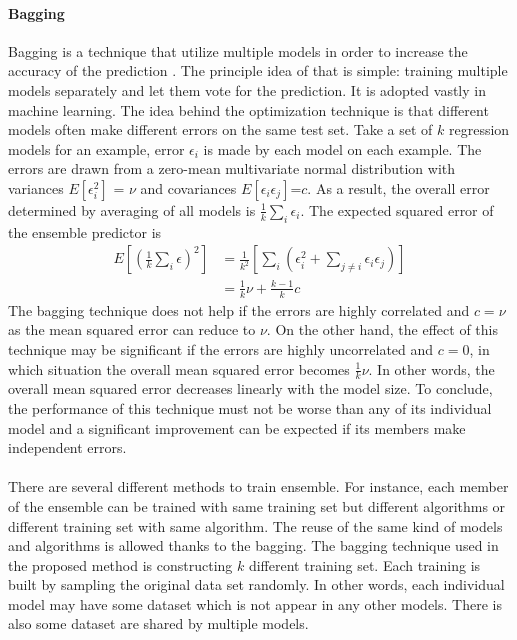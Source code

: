 \paragraph{Bagging}
\label{adp_sec:ml_bagging}
Bagging is a technique that utilize multiple models in order to increase the accuracy of the prediction \citep{Breiman1996}.
The principle idea of that is simple: training multiple models separately and let them vote for the prediction.
It is adopted vastly in machine learning.
The idea behind the optimization technique is that different models often make different errors on the same test set.
Take a set of $k$ regression models for an example, error $\epsilon_i$ is made by each model on each example.
The errors are drawn from a zero-mean multivariate normal distribution with variances $E[\epsilon_i^2]$ = $\nu$ and covariances $E[\epsilon_i \epsilon_j]$=$c$.
As a result, the overall error determined by averaging of all models is $\frac{1}{k}\sum_i \epsilon_i$.
The expected squared error of the ensemble predictor is
\begin{equation}
    \begin{aligned}
    E[(\frac{1}{k} \sum_i \epsilon)^2] &=
    \frac{1}{k^2}[
        \sum_i (
            \epsilon_i^2 + \sum_{j\neq i}\epsilon_i \epsilon_j
        )
    ] \\
    &= \frac{1}{k}\nu + \frac{k-1}{k}c
    \end{aligned}
\end{equation}
%
The bagging technique does not help if the errors are highly correlated and $c=\nu$ as the mean squared error can reduce to $\nu$.
On the other hand, the effect of this technique may be significant if the errors are highly uncorrelated and $c=0$, in which situation the overall mean squared error becomes $\frac{1}{k}\nu$.
In other words, the overall mean squared error decreases linearly with the model size.
To conclude, the performance of this technique must not be worse than any of its individual model and a significant improvement can be expected if its members make independent errors.

\paragraph{}
There are several different methods to train ensemble.
For instance, each member of the ensemble can be trained with same training set but different algorithms or different training set with same algorithm.
The reuse of the same kind of models and algorithms is allowed thanks to the bagging.
The bagging technique used in the proposed method is constructing $k$ different training set.
Each training is built by sampling the original data set randomly.
In other words, each individual model may have some dataset which is not appear in any other models.
There is also some dataset are shared by multiple models.

